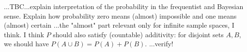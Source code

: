 ...TBC...explain interpretation of the probability in the frequentist and Bayesian sense. Explain how probability zero means (almost) impossible and one means (almost) certain ...the "almost" part relevant only for infinite sample spaces, I think. I think $P$ should also satisfy (countable) additivity: for disjoint sets $A,B$, we should have $P(A \cup B) = P(A) + P(B)$. ...verify! 











\begin{comment}

Probability is just...really weird
https://www.youtube.com/watch?v=zczGnnM05TQ

\end{comment}

